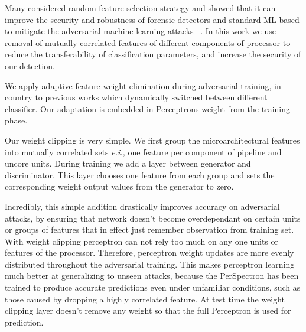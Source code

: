 Many considered random feature selection
strategy and showed that it can improve the security and robustness of forensic detectors and
standard ML-based to mitigate the adversarial machine learning attacks ~\cite{nowroozi2020survey, secureDetection2019}.
 In this work we use removal of mutually correlated features of different components of processor to reduce the transferability of classification parameters, and increase the security of our 
detection. 

We apply adaptive feature weight elimination during adversarial training, in country to previous works which dynamically switched between different classifier. Our adaptation is embedded in Perceptrons weight from the training phase.  

Our weight clipping is very simple. We first group the microarchitectural features into mutually correlated sets {\em e.i.,} one feature per component of pipeline and uncore units. During training we add a layer between generator and discriminator. This layer chooses one feature from each group and sets the corresponding weight output values from the generator to zero.

Incredibly, this simple addition drastically improves accuracy on adversarial attacks, by ensuring that network doesn't become overdependant on certain units or groups of features that in effect just remember observation from training set. With weight clipping perceptron can not rely too much on any one units or features of the processor. Therefore, perceptron weight updates are more evenly distributed throughout the adversarial training. This makes perceptron learning much better at generalizing to unseen attacks, because the PerSpectron has been trained to produce accurate predictions even under unfamiliar conditions, such as those caused by dropping a highly correlated feature. At test time the weight clipping layer doesn't remove any weight so that the full Perceptron is used for prediction. 





